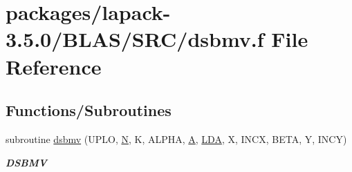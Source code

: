\hypertarget{lapack-3_85_80_2BLAS_2SRC_2dsbmv_8f}{}\section{packages/lapack-\/3.5.0/\+B\+L\+A\+S/\+S\+R\+C/dsbmv.f File Reference}
\label{lapack-3_85_80_2BLAS_2SRC_2dsbmv_8f}
\subsection*{Functions/\+Subroutines}
\begin{DoxyCompactItemize}
\item 
subroutine \hyperlink{group__double__blas__level2_ga5c7ca036c788c5fd42e04ade0dc92d44}{dsbmv} (U\+P\+L\+O, \hyperlink{polmisc_8c_a0240ac851181b84ac374872dc5434ee4}{N}, K, A\+L\+P\+H\+A, \hyperlink{classA}{A}, \hyperlink{example__user_8c_ae946da542ce0db94dced19b2ecefd1aa}{L\+D\+A}, X, I\+N\+C\+X, B\+E\+T\+A, Y, I\+N\+C\+Y)
\begin{DoxyCompactList}\small\item\em {\bfseries D\+S\+B\+M\+V} \end{DoxyCompactList}\end{DoxyCompactItemize}
